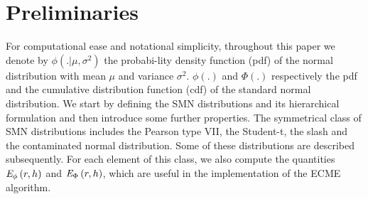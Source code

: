 \section{Preliminaries} \label{Prelim}
For computational ease and notational simplicity, throughout this
paper we denote by $\phi\left(.|\mu,\sigma^2\right)$ the
probabi-lity density function (pdf) of the normal distribution with
mean $\mu$ and variance $\sigma^2$. $\phi(.)$ and $\Phi(.)$
respectively the pdf and the cumulative distribution function (cdf)
of the standard normal distribution.  We start by defining the SMN
distributions and its hierarchical formulation and then introduce
some further properties.
The symmetrical class of SMN distributions includes the Pearson type
VII, the Student-t, the slash and the contaminated normal
distribution. Some of these distributions are described
subsequently. For each element of this class, we also compute the
quantities $\textrm{\em E}_{\phi}\left(r,h\right)$ and $\textrm{\em
E}_{\Phi}\left(r,h\right)$, which are useful in the implementation
of the ECME algorithm. 

